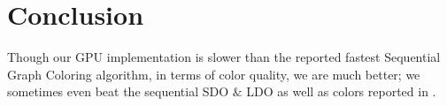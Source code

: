 \documentclass[preprint]{sigplanconf}
\begin{document}
\section{Conclusion}
Though our GPU implementation is slower than the reported fastest Sequential Graph Coloring algorithm, in terms of color quality, we are much better; we sometimes even beat the sequential SDO $\&$ LDO as well as colors reported in \cite{bozdag2008a}.


%
%
%











\end{document}

